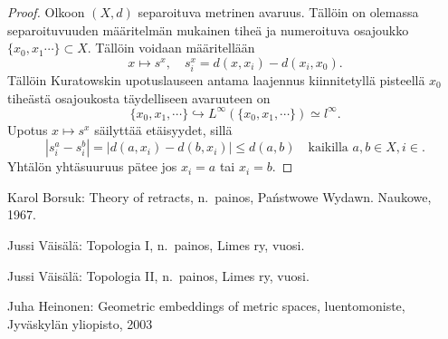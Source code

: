 \documentclass[12pt,a4paper,leqno]{report}
\theoremstyle{plain}
\theoremstyle{definition}
\theoremstyle{remark}
\begin{document}

\begin{proof}
Olkoon $(X,d)$ separoituva metrinen avaruus. Tällöin on olemassa separoituvuuden määritelmän mukainen tiheä ja numeroituva osajoukko $\{x_0,x_1\cdots \}\subset X$. Tällöin voidaan määritellään 
$$x\mapsto s^x,\quad s^x_i=d(x,x_i)-d(x_i,x_0).$$
Tällöin Kuratowskin upotuslauseen antama laajennus kiinnitetyllä pisteellä $x_0$ tiheästä osajoukosta täydelliseen avaruuteen on
$$\{x_0,x_1,\cdots\}\hookrightarrow L^\infty (\{x_0,x_1,\cdots\})\simeq l^\infty. $$
Upotus $x\mapsto s^x$ säilyttää etäisyydet, sillä 
$$|s^a_i-s^b_i|=|d(a,x_i)-d(b,x_i)|\leq d(a,b)\quad \text{kaikilla } a,b\in X,i\in .$$
Yhtälön yhtäsuuruus pätee jos $x_i=a$ tai $x_i=b$. 

\end{proof}








\begin{thebibliography}{9}

Karol Borsuk: Theory of retracts, n.\ painos, Państwowe Wydawn. Naukowe, 1967.

Jussi Väisälä: Topologia I, n.\ painos, Limes ry, vuosi.

Jussi Väisälä: Topologia II, n.\ painos, Limes ry, vuosi.

Juha Heinonen: Geometric embeddings of metric spaces, luentomoniste, Jyväskylän yliopisto, 2003


\end{thebibliography}
\end{document}
